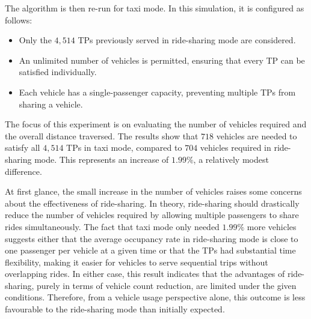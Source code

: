 

The algorithm is then re-run for taxi mode. In this simulation, it is configured as follows:
\begin{itemize}
    \item Only the $4,514$ TPs previously served in ride-sharing mode are considered.
    \item An unlimited number of vehicles is permitted, ensuring that every TP can be satisfied individually.
    \item Each vehicle has a single-passenger capacity, preventing multiple TPs from sharing a vehicle.
\end{itemize}

The focus of this experiment is on evaluating the number of vehicles required and the overall distance traversed. The results show that $718$ vehicles are needed to satisfy all $4,514$ TPs in taxi mode, compared to $704$ vehicles required in ride-sharing mode. This represents an increase of $1.99\%$, a relatively modest difference.

At first glance, the small increase in the number of vehicles raises some concerns about the effectiveness of ride-sharing. In theory, ride-sharing should drastically reduce the number of vehicles required by allowing multiple passengers to share rides simultaneously. The fact that taxi mode only needed $1.99\%$ more vehicles suggests either that the average occupancy rate in ride-sharing mode is close to one passenger per vehicle at a given time or that the TPs had substantial time flexibility, making it easier for vehicles to serve sequential trips without overlapping rides. In either case, this result indicates that the advantages of ride-sharing, purely in terms of vehicle count reduction, are limited under the given conditions. Therefore, from a vehicle usage perspective alone, this outcome is less favourable to the ride-sharing mode than initially expected.


